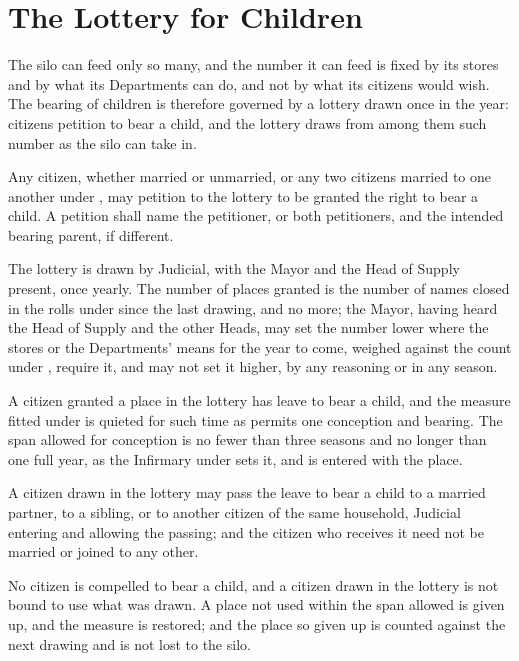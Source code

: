 \section{The Lottery for Children}
\label{sec:marriage:lottery-for-children}

The silo can feed only so many, and the number it can feed is fixed by its stores and by what its Departments can do, and not by what its citizens would wish. The bearing of children is therefore governed by a lottery drawn once in the year: citizens petition to bear a child, and the lottery draws from among them such number as the silo can take in.

\begin{clauses}
\item Any citizen, whether married or unmarried, or any two citizens married to one another under , may petition to the lottery to be granted the right to bear a child. A petition shall name the petitioner, or both petitioners, and the intended bearing parent, if different.
\item The lottery is drawn by Judicial, with the Mayor and the Head of Supply present, once yearly. The number of places granted is the number of names closed in the rolls under  since the last drawing, and no more; the Mayor, having heard the Head of Supply and the other Heads, may set the number lower where the stores or the Departments' means for the year to come, weighed against the count under , require it, and may not set it higher, by any reasoning or in any season.
\item A citizen granted a place in the lottery has leave to bear a child, and the measure fitted under  is quieted for such time as permits one conception and bearing. The span allowed for conception is no fewer than three seasons and no longer than one full year, as the Infirmary under  sets it, and is entered with the place.
\item A citizen drawn in the lottery may pass the leave to bear a child to a married partner, to a sibling, or to another citizen of the same household, Judicial entering and allowing the passing; and the citizen who receives it need not be married or joined to any other.
\item No citizen is compelled to bear a child, and a citizen drawn in the lottery is not bound to use what was drawn. A place not used within the span allowed is given up, and the measure is restored; and the place so given up is counted against the next drawing and is not lost to the silo.
\end{clauses}

